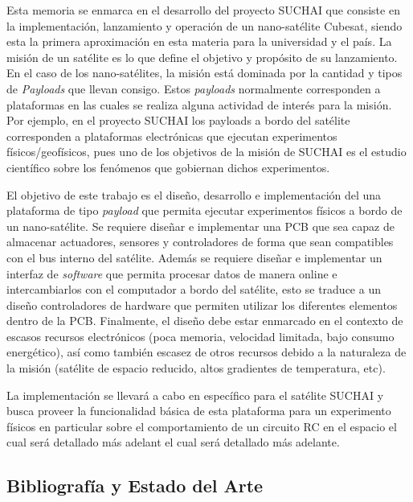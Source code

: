 \documentclass[11pt,letterpaper]{article}
\begin{document}
Esta memoria se enmarca en el desarrollo del proyecto SUCHAI que consiste en la implementación, lanzamiento y operación de un nano-satélite Cubesat, siendo esta la primera aproximación en esta materia para la universidad y el país. La misión de un sat\'elite es lo que define el objetivo y propósito de su lanzamiento. En el caso de los nano-sat\'elites, la misión está dominada por la cantidad y tipos de \textit{Payloads} que llevan consigo. Estos \textit{payloads} normalmente corresponden a plataformas en las cuales se realiza alguna actividad de inter\'es para la misión. Por ejemplo, en el proyecto SUCHAI los payloads a bordo del sat\'elite corresponden a plataformas electrónicas que ejecutan experimentos físicos/geofísicos, pues uno de los objetivos de la misión de SUCHAI es el estudio científico sobre los fenómenos que gobiernan dichos experimentos.

El objetivo de este trabajo es el diseño, desarrollo e implementación del una plataforma de tipo \textit{payload} que permita ejecutar experimentos físicos a bordo de un nano-sat\'elite. Se requiere diseñar e implementar una PCB que sea capaz de almacenar actuadores, sensores y controladores de forma que sean compatibles con el bus interno del sat\'elite. Además se requiere diseñar e implementar un interfaz de \textit{software} que permita procesar datos de manera online e intercambiarlos con el computador a bordo del sat\'elite, esto se traduce a un diseño controladores de hardware que permiten utilizar los diferentes elementos dentro de la PCB. Finalmente, el diseño debe estar enmarcado en el contexto de escasos recursos electrónicos (poca memoria, velocidad limitada, bajo consumo energ\'etico), así como tambi\'en escasez de otros recursos debido a la naturaleza de la misión (sat\'elite de espacio reducido, altos gradientes de temperatura, etc).

La implementación se llevará a cabo en específico para el satélite SUCHAI y busca proveer la funcionalidad básica de esta plataforma para un experimento físicos en particular sobre el comportamiento de un circuito RC en el espacio el cual será detallado más adelant el cual será detallado más adelante.

\subsection{Bibliografía y Estado del Arte}

\end{document}
